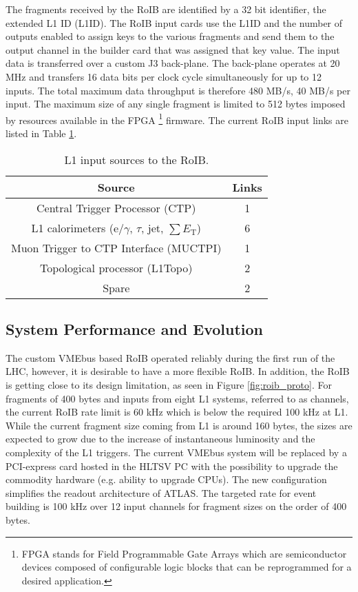 The fragments received by the RoIB are identified by a 32 bit identifier, the extended L1 ID (L1ID). 
The RoIB input cards use the L1ID and the number of outputs enabled to assign keys to the various fragments and send them to the output channel in the builder card that was 
assigned that key value. The input data is transferred over a custom J3 back-plane. The back-plane operates at 20 MHz and transfers 16 data bits per 
clock cycle simultaneously for up to 12 inputs. The total maximum data throughput is therefore 480 MB/s, 40 MB/s per input.  
The maximum size of any single fragment is limited to 512 bytes imposed by resources available in the FPGA 
\footnote{FPGA stands for Field Programmable Gate Arrays 
 which are semiconductor devices composed of configurable logic blocks 
that can be reprogrammed for a desired application.}
firmware. The current RoIB input 
links are listed in Table \ref{tab:roib_links}.

\begin{table}[tbp]
\caption{L1 input sources to the RoIB.}
\label{tab:roib_links}
\smallskip
\centering
\begin{tabular}{|c|c|}
\hline
Source & Links\\
\hline
Central Trigger Processor (CTP)  & 1  \\
L1 calorimeters (e/$\gamma$, $\tau$, jet, $\sum E_\mathrm{T}$) & 6  \\
Muon Trigger to CTP Interface (MUCTPI) & 1  \\
Topological processor (L1Topo) & 2  \\
Spare & 2 \\
\hline
\end{tabular}
\end{table}

\subsection{System Performance and Evolution}\label{sec:roib_limit}

The custom VMEbus based RoIB operated reliably during the first run of the LHC, however, it is desirable to have a more flexible RoIB. 
In addition, the RoIB is getting close to its design limitation, as seen 
in Figure \ref{fig:roib_proto}. For fragments of 400 bytes and inputs from eight L1 systems, referred to as channels, the current RoIB rate limit is 60 kHz which is below the required 100 kHz at 
L1. While the current fragment size coming from L1 is around 160 bytes, the sizes are expected to grow due to the increase of instantaneous 
luminosity and the complexity of the L1 triggers. 
The current VMEbus system will be replaced by a PCI-express card hosted in the HLTSV PC with the 
possibility to upgrade the commodity hardware (e.g. ability to upgrade CPUs). 
The new configuration simplifies the readout architecture of ATLAS. The targeted rate for event building is 100 kHz over 12 input channels for 
fragment sizes on the order of 400 bytes.
